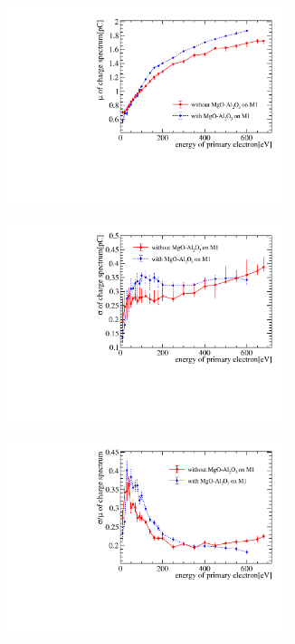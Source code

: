 \begin{figure}[htbp]
	\centering
	\begin{subfigure}[b]{0.5\textwidth}
		\centering
		\includegraphics[width=0.9\textwidth]{PMTRelated/GTmodel/gain_mu.pdf}
		\caption{}
		\label{fig:gain}
	\end{subfigure}%
	\begin{subfigure}[b]{0.5\textwidth}
		\centering
		\includegraphics[width=0.9\textwidth]{PMTRelated/GTmodel/gain_sigma.pdf}
		\caption{}
		\label{fig:sigma}
	\end{subfigure}
	\hfill
	\begin{subfigure}[b]{0.5\textwidth}
		\centering
		\includegraphics[width=0.9\textwidth]{PMTRelated/GTmodel/gain_sigmamu.pdf}

\end{subfigure}
\end{figure}
